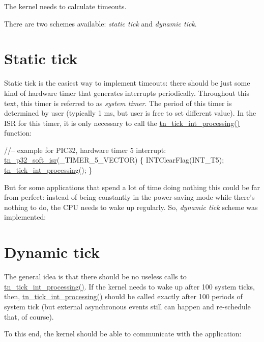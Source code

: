 The kernel needs to calculate timeouts.

There are two schemes available\+: {\itshape static tick} and {\itshape dynamic tick}.\hypertarget{time_ticks_time_ticks__static_tick}{}\section{Static tick}\label{time_ticks_time_ticks__static_tick}
Static tick is the easiest way to implement timeouts\+: there should be just some kind of hardware timer that generates interrupts periodically. Throughout this text, this timer is referred to as {\itshape system timer}. The period of this timer is determined by user (typically 1 ms, but user is free to set different value). In the I\+S\+R for this timer, it is only necessary to call the {\ttfamily \hyperlink{tn__sys_8h_a944d96c7a5d442d271115b6cb22a085b}{tn\+\_\+tick\+\_\+int\+\_\+processing()}} function\+:


\begin{DoxyCode}
\textcolor{comment}{//-- example for PIC32, hardware timer 5 interrupt:}
\hyperlink{tn__arch__pic32_8h_a02d853d8d573f928fb8da65ef0c2bc8e}{tn\_p32\_soft\_isr}(\_TIMER\_5\_VECTOR)
\{
   INTClearFlag(INT\_T5);
   \hyperlink{tn__sys_8h_a944d96c7a5d442d271115b6cb22a085b}{tn\_tick\_int\_processing}();
\}
\end{DoxyCode}


But for some applications that spend a lot of time doing nothing this could be far from perfect\+: instead of being constantly in the power-\/saving mode while there's nothing to do, the C\+P\+U needs to wake up regularly. So, {\itshape dynamic tick} scheme was implemented\+:\hypertarget{time_ticks_time_ticks__dynamic_tick}{}\section{Dynamic tick}\label{time_ticks_time_ticks__dynamic_tick}
The general idea is that there should be no useless calls to {\ttfamily \hyperlink{tn__sys_8h_a944d96c7a5d442d271115b6cb22a085b}{tn\+\_\+tick\+\_\+int\+\_\+processing()}}. If the kernel needs to wake up after 100 system ticks, then, {\ttfamily \hyperlink{tn__sys_8h_a944d96c7a5d442d271115b6cb22a085b}{tn\+\_\+tick\+\_\+int\+\_\+processing()}} should be called exactly after 100 periods of system tick (but external asynchronous events still can happen and re-\/schedule that, of course).

To this end, the kernel should be able to communicate with the application\+:


